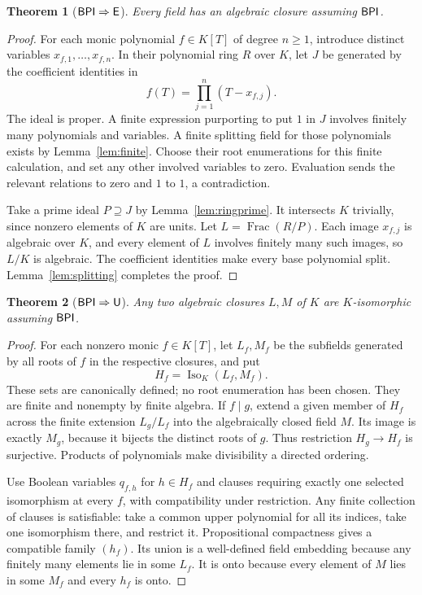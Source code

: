 \documentclass[11pt,a4paper]{article}
\newtheorem{theorem}{Theorem}[section]
\theoremstyle{definition}\newtheorem{definition}[theorem]{Definition}
\theoremstyle{remark}\newtheorem{remark}[theorem]{Remark}
\newcommand{\E}{\mathsf E}\newcommand{\U}{\mathsf U}
\DeclareMathOperator{\Iso}{Iso}\DeclareMathOperator{\Aut}{Aut}
\DeclareMathOperator{\Frac}{Frac}\DeclareMathOperator{\Fix}{Fix}
\begin{document}
\begin{theorem}[$\BPI\Rightarrow\E$]\label{thm:bpie}
Every field has an algebraic closure assuming $\mathsf{BPI}$.
\end{theorem}
\begin{proof}
For each monic polynomial $f\in K[T]$ of degree $n\geq1$, introduce distinct variables $x_{f,1},\ldots,x_{f,n}$. In their polynomial ring $R$ over $K$, let $J$ be generated by the coefficient identities in
\[
f(T)=\prod_{j=1}^{n}(T-x_{f,j}).
\]
The ideal is proper. A finite expression purporting to put $1$ in $J$ involves finitely many polynomials and variables. A finite splitting field for those polynomials exists by Lemma~\ref{lem:finite}. Choose their root enumerations for this finite calculation, and set any other involved variables to zero. Evaluation sends the relevant relations to zero and $1$ to $1$, a contradiction.

Take a prime ideal $P\supseteq J$ by Lemma~\ref{lem:ringprime}. It intersects $K$ trivially, since nonzero elements of $K$ are units. Let $L=\Frac(R/P)$. Each image $x_{f,j}$ is algebraic over $K$, and every element of $L$ involves finitely many such images, so $L/K$ is algebraic. The coefficient identities make every base polynomial split. Lemma~\ref{lem:splitting} completes the proof.
\end{proof}



\begin{theorem}[$\BPI\Rightarrow\U$]\label{thm:bpiu}
Any two algebraic closures $L,M$ of $K$ are $K$-isomorphic assuming $\mathsf{BPI}$.
\end{theorem}
\begin{proof}
For each nonzero monic $f\in K[T]$, let $L_f,M_f$ be the subfields generated by all roots of $f$ in the respective closures, and put
\[
H_f=\Iso_K(L_f,M_f).
\]
These sets are canonically defined; no root enumeration has been chosen. They are finite and nonempty by finite algebra. If $f\mid g$, extend a given member of $H_f$ across the finite extension $L_g/L_f$ into the algebraically closed field $M$. Its image is exactly $M_g$, because it bijects the distinct roots of $g$. Thus restriction $H_g\to H_f$ is surjective. Products of polynomials make divisibility a directed ordering.

Use Boolean variables $q_{f,h}$ for $h\in H_f$ and clauses requiring exactly one selected isomorphism at every $f$, with compatibility under restriction. Any finite collection of clauses is satisfiable: take a common upper polynomial for all its indices, take one isomorphism there, and restrict it. Propositional compactness gives a compatible family $(h_f)$. Its union is a well-defined field embedding because any finitely many elements lie in some $L_f$. It is onto because every element of $M$ lies in some $M_f$ and every $h_f$ is onto.
\end{proof}
\end{document}

